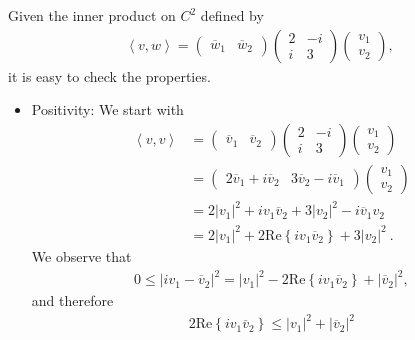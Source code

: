\begin{questions}

\begin{solution}
Given the inner product on $C^2$ defined by
\begin{align*}
\left<v,w\right>=\begin{pmatrix}
\overline{w}_1&\overline{w}_2
\end{pmatrix}\begin{pmatrix}
2&-i\\i&3
\end{pmatrix}\begin{pmatrix}
v_1\\v_2
\end{pmatrix},
\end{align*}
it is easy to check the properties.
\begin{itemize}
\item Positivity:
We start with
\begin{align*}
\left<v,v\right>&=\begin{pmatrix}
\overline{v}_1&\overline{v}_2
\end{pmatrix}\begin{pmatrix}
2&-i\\i&3
\end{pmatrix}\begin{pmatrix}
v_1\\v_2
\end{pmatrix}\\
&=\begin{pmatrix}
2\overline{v}_1+i\overline{v}_2&3\overline{v}_2-i\overline{v}_1
\end{pmatrix}\begin{pmatrix}
v_1\\v_2
\end{pmatrix}\\
&=2|v_1|^2+iv_1\overline{v}_2+3|v_2|^2-i\overline{v}_1v_2\\
&=2|v_1|^2+2\text{Re}\left\lbrace iv_1\overline{v}_2 \right\rbrace+3|v_2|^2~.
\end{align*}
We observe that
\begin{align*}
0\leq |iv_1-\overline{v}_2|^2=|v_1|^2-2\text{Re}\left\lbrace iv_1\overline{v}_2 \right\rbrace+|\overline{v}_2|^2,
\end{align*}
and therefore
\begin{align*}
2\text{Re}\left\lbrace iv_1\overline{v}_2 \right\rbrace\leq  |v_1|^2+|\overline{v}_2|^2

\end{align*}
\end{itemize}
\end{solution}
\end{questions}
